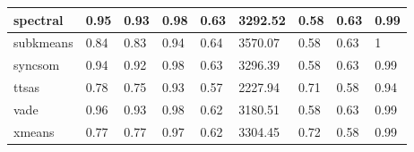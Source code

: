 \begin{table}[H]
\begin{tabular}{|l|l|l|l|l|l|l|l|l|}
\hline
spectral & 0.95 & 0.93 & 0.98 & 0.63 & 3292.52 & 0.58 & 0.63 & 0.99 \\
\hline
subkmeans & 0.84 & 0.83 & 0.94 & 0.64 & 3570.07 & 0.58 & 0.63 & 1 \\
\hline
syncsom & 0.94 & 0.92 & 0.98 & 0.63 & 3296.39 & 0.58 & 0.63 & 0.99 \\
\hline
ttsas & 0.78 & 0.75 & 0.93 & 0.57 & 2227.94 & 0.71 & 0.58 & 0.94 \\
\hline
vade & 0.96 & 0.93 & 0.98 & 0.62 & 3180.51 & 0.58 & 0.63 & 0.99 \\
\hline
xmeans & 0.77 & 0.77 & 0.97 & 0.62 & 3304.45 & 0.72 & 0.58 & 0.99 \\
\hline
\end{tabular}
\end{table}